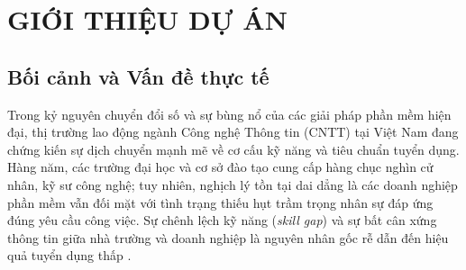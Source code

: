 \chapter{GIỚI THIỆU DỰ ÁN}
\label{chap:gioi-thieu}

\section{Bối cảnh và Vấn đề thực tế}
\label{sec:boi-canh}

Trong kỷ nguyên chuyển đổi số và sự bùng nổ của các giải pháp phần mềm hiện đại, thị trường lao động ngành Công nghệ Thông tin (CNTT) tại Việt Nam đang chứng kiến sự dịch chuyển mạnh mẽ về cơ cấu kỹ năng và tiêu chuẩn tuyển dụng. Hàng năm, các trường đại học và cơ sở đào tạo cung cấp hàng chục nghìn cử nhân, kỹ sư công nghệ; tuy nhiên, nghịch lý tồn tại dai dẳng là các doanh nghiệp phần mềm vẫn đối mặt với tình trạng thiếu hụt trầm trọng nhân sự đáp ứng đúng yêu cầu công việc. Sự chênh lệch kỹ năng (\textit{skill gap}) và sự bất cân xứng thông tin giữa nhà trường và doanh nghiệp là nguyên nhân gốc rễ dẫn đến hiệu quả tuyển dụng thấp \cite{pressman2020}.

